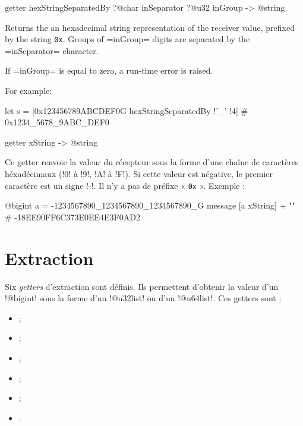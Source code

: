 
\begin{galgas4box}
getter hexStringSeparatedBy ?@char inSeparator ?@u32 inGroup -> @string
\end{galgas4box}

Returns the an hexadecimal string representation of the receiver value, prefixed by the string \texttt{0x}. Groups of \ggsq=inGroup= digits are separated by the \ggsq=inSeparator= character.

If \ggsq=inGroup= is equal to zero, a run-time error is raised.

For example:
\begin{galgas4}
let s = [0x123456789ABCDEF0G hexStringSeparatedBy !'_' !4] # 0x1234_5678_9ABC_DEF0
\end{galgas4}







\begin{galgas4box}
getter xString -> @string
\end{galgas4box}

Ce getter renvoie la valeur du récepteur sous la forme d'une chaîne de caractères héxadécimaux (\ggsq!0! à \ggsq!9!, \ggsq!A! à \ggsq!F!). Si cette valeur est négative, le premier caractère est un signe \ggsq!-!. Il n'y a pas de préfixe « \texttt{0x} ». Exemple :

\begin{galgas4}
@bigint a = -1234567890_1234567890_1234567890_G
message [a xString] + "\n" # -18EE90FF6C373E0EE4E3F0AD2
\end{galgas4}









\section{Extraction}

Six \emph{getters} d'extraction sont définis. Ils permettent d'obtenir la valeur d'un \ggsq!@bigint! sous la forme d'un \ggsq!@u32list! ou d'un \ggsq!@u64list!. Ces getters sont :
\begin{itemize}
  \item {} ;
  \item {} ;
  \item {} ;
  \item {} ;
  \item {} ;
  \item {}.
\end{itemize}

